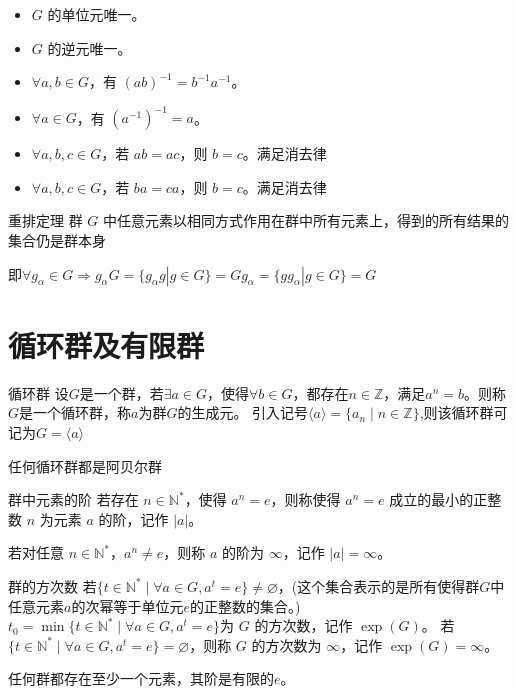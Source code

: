 \documentclass[12pt, openany]{ctexbook} %
\numberwithin{equation}{section} %
\begin{document}
\begin{itemize}
    \item $ G $ 的单位元唯一。
    \item $ G $ 的逆元唯一。
    \item $\forall a, b \in G$，有 $(ab)^{-1} = b^{-1}a^{-1}$。
    \item $\forall a \in G$，有 $(a^{-1})^{-1} = a$。
    \item $\forall a, b, c \in G$，若 $ab = ac$，则 $b = c$。满足消去律
    \item $\forall a, b, c \in G$，若 $ba = ca$，则 $b = c$。满足消去律
\end{itemize}
\begin{mytheo}{重排定理}
  群 $G$ 中任意元素以相同方式作用在群中所有元素上，得到的所有结果的集合仍是群本身

  即$\forall g_\alpha\in G\Rightarrow g_\alpha G=\{g_\alpha g|g\in G\}=Gg_\alpha=\{gg_\alpha|g\in G\}=G$
\end{mytheo}
\section{循环群及有限群}
\begin{mydef}{循环群}
  设$G$是一个群，若$\exists a \in G$，使得$\forall b \in G$，都存在$n\in \mathbb{Z}$，满足$a^n=b$。则称$G$是一个循环群，称$a$为群$G$的生成元。
引入记号$\langle a\rangle=\{a_n\mid n\in\mathbb{Z}\}$,则该循环群可记为$G=\langle a\rangle$
\end{mydef}

任何循环群都是阿贝尔群

\begin{mydef}{群中元素的阶}
  若存在 $n\in\mathbb{N}^*$，使得 $a^{n}=e$，则称使得 $a^{n}=e$ 成立的最小的正整数 $n$ 为元素 $a$ 的阶，记作 $\vert a\vert$。

  若对任意 $n\in\mathbb{N}^*$，$a^{n}\neq e$，则称 $a$ 的阶为 $\infty$，记作 $\vert a\vert=\infty$。


\end{mydef}
\begin{mydef}{群的方次数}
  若\(\{t\in\mathbb{N}^*\mid\forall a\in G,a^{t}=e\}\neq\varnothing\)，(这个集合表示的是所有使得群$G$中任意元素$a$的次幂等于单位元$e$的正整数的集合。)
  \(t_0=\min\{t\in\mathbb{N}^*\mid\forall a\in G,a^{t}=e\}\)为 \(G\) 的方次数，记作 $\exp(G)$。
  若\(\{t\in\mathbb{N}^*\mid\forall a\in G,a^{t}=e\}=\varnothing\)，则称 \(G\) 的方次数为 $\infty$，记作 $\exp(G)=\infty$。
\end{mydef}
任何群都存在至少一个元素，其阶是有限的$e$。
\end{document}
